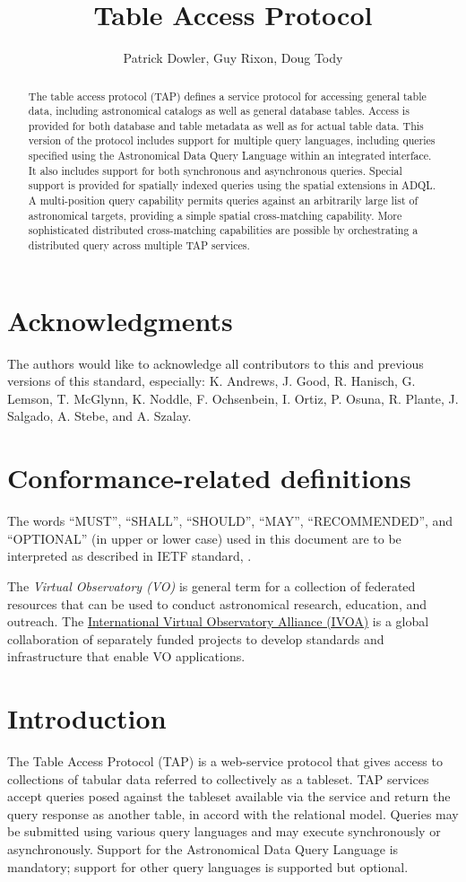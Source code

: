 \documentclass[11pt,letter]{ivoa}
\title{Table Access Protocol}
\author{Patrick Dowler, Guy Rixon, Doug Tody}
\begin{document}
\begin{abstract}
The table access protocol (TAP) defines a service protocol for accessing general 
table data, including astronomical catalogs as well as general database tables. 
Access is provided for both database and table metadata as well as for actual 
table data. This version of the protocol includes support for multiple query 
languages, including queries specified using the Astronomical Data Query 
Language \citep{std:ADQL} within an integrated interface. It also includes 
support 
for both synchronous and asynchronous queries. Special support is provided for
spatially indexed queries using the spatial extensions in ADQL. A multi-position 
query capability permits queries against an arbitrarily large list of 
astronomical targets, providing a simple spatial cross-matching capability. 
More sophisticated distributed cross-matching capabilities are possible by 
orchestrating a distributed query across multiple TAP services.  
\end{abstract}


\section*{Acknowledgments}

The authors would like to acknowledge all contributors to this and previous 
versions of this standard, especially: K. Andrews, J. Good, R. Hanisch, G. 
Lemson, T. McGlynn, K. Noddle, F. Ochsenbein, I. Ortiz, P. Osuna, R. Plante, 
J. Salgado, A. Stebe, and A. Szalay.


\section*{Conformance-related definitions}

The words ``MUST'', ``SHALL'', ``SHOULD'', ``MAY'', ``RECOMMENDED'', and
``OPTIONAL'' (in upper or lower case) used in this document are to be
interpreted as described in IETF standard, \citet{std:RFC2119}.

The \emph{Virtual Observatory (VO)} is general term for a collection of 
federated resources that can be used to conduct astronomical research, 
education, and outreach. The \href{http://www.ivoa.net}{International
Virtual Observatory Alliance (IVOA)} is a global collaboration of separately 
funded projects to develop standards and infrastructure that enable VO 
applications.


\section{Introduction}
The Table Access Protocol (TAP) is a web-service protocol that gives access to 
collections of tabular data referred to collectively as a tableset.  TAP 
services accept queries posed against the tableset available via the service and 
return the query response as another table, in accord with the relational model. 
 Queries may be submitted using various query languages and may execute 
synchronously or asynchronously. Support for the Astronomical Data Query 
Language \citep{std:ADQL} is mandatory; support for other query languages is 
supported 
but optional.
\end{document}
